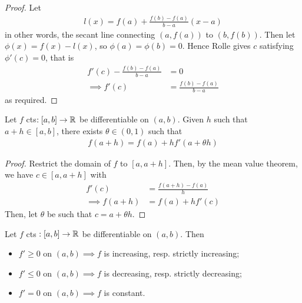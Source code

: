 \documentclass{../../template/note}
\begin{document}
    \begin{proof}
        Let
        \begin{align*}
            l(x) = f(a) + \frac{f(b)-f(a)}{b-a}(x-a)
        \end{align*}
        in other words, the secant line connecting \((a, f(a))\) to \((b, f(b))\). Then let \(\phi(x) = f(x) - l(x)\), so \(\phi(a) = \phi(b) = 0\). Hence Rolle gives \(c\) satisfying \(\phi'(c) = 0\), that is
        \begin{align*}
            f'(c) - \frac{f(b)-f(a)}{b-a} &= 0 \\
            \implies f'(c) &= \frac{f(b)-f(a)}{b-a}
        \end{align*}
        as required.
    \end{proof}
    
    \begin{corollary}
        \label{mvt-cor-1}
        Let \(f\) cts\(: [a, b] \to \mathbb R\) be differentiable on \((a, b)\). Given \(h\) such that \(a + h \in [a, b]\), there exists \(\theta \in (0, 1)\) such that
        \begin{align*}
            f(a+h) = f(a) + hf'(a+\theta h)
        \end{align*}
    \end{corollary}
    
    \begin{proof}
        Restrict the domain of \(f\) to \([a, a+h]\). Then, by the mean value theorem, we have \(c \in [a, a+h]\) with
        \begin{align*}
            f'(c) &= \frac{f(a+h)-f(a)}{h} \\
            \implies f(a+h) &= f(a) + hf'(c)
        \end{align*}
        Then, let \(\theta\) be such that \(c = a+\theta h\).        
    \end{proof}
    
    \begin{corollary}
        \label{mvt-cor-2}
        Let \(f\) cts \(: [a, b] \to \mathbb R\) be differentiable on \((a, b)\). Then
        \begin{itemize}
            \item \(f' \geq 0\) on \((a,b) \implies f\) is increasing, resp. strictly increasing;
            \item \(f' \leq 0\) on \((a,b) \implies f\) is decreasing, resp. strictly decreasing;
            \item \(f' = 0\) on \((a,b) \implies f\) is constant.
        \end{itemize}
    \end{corollary}
    
\end{document}
